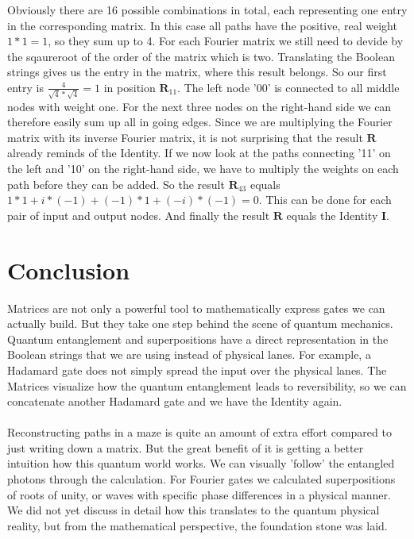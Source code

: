 \documentclass[oneside]{thesisclass}
\begin{document}
Obviously there are 16 possible combinations in total, each representing one entry in the corresponding matrix.
In this case all paths have the positive, real weight $1 * 1 = 1$, so they sum up to 4. 
For each Fourier matrix we still need to devide by the sqaureroot of the order of the matrix which is two.
Translating the Boolean strings gives us the entry in the matrix, where this result belongs.
So our first entry is $\frac{4}{\sqrt 4 * \sqrt 4} = 1$ in position $\mathbf R_{11}$.
The left node '00' is connected to all middle nodes with weight one.
For the next three nodes on the right-hand side we can therefore easily sum up all in going edges.
Since we are multiplying the Fourier matrix with its inverse Fourier matrix, it is not surprising that the result $\mathbf R$ already reminds of the Identity.
If we now look at the paths connecting '11' on the left and '10' on the right-hand side, we have to multiply the weights on each path before they can be added.
So the result $\mathbf R_{43}$ equals $1 * 1 + i * (-1) + (-1) * 1 + (-i) * (-1) = 0$.
This can be done for each pair of input and output nodes.
And finally the result $\mathbf R$ equals the Identity $\mathbf I$.\\

\chapter{Conclusion}
Matrices are not only a powerful tool to mathematically express gates we can actually build.
But they take one step behind the scene of quantum mechanics.
Quantum entanglement and superpositions have a direct representation in the Boolean strings that we are using instead of physical lanes.
For example, a Hadamard gate does not simply spread the input over the physical lanes.
The Matrices visualize how the quantum entanglement leads to reversibility, so we can concatenate another Hadamard gate and we have the Identity again.\\
\\Reconstructing paths in a maze is quite an amount of extra effort compared to just writing down a matrix.
But the great benefit of it is getting a better intuition how this quantum world works.
We can visually 'follow' the entangled photons through the calculation.
For Fourier gates we calculated superpositions of roots of unity, or waves with specific phase differences in a physical manner.
We did not yet discuss in detail how this translates to the quantum physical reality, but from the mathematical perspective, the foundation stone was laid.\\




\end{document}
